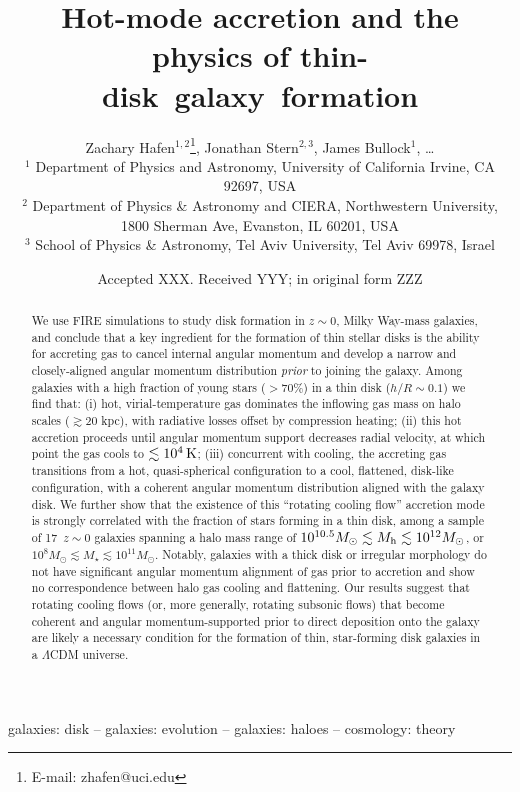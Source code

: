 \documentclass[fleqn,usenatbib]{mnras}
\title[Rotating cooling flows and thin galactic disks]{Hot-mode accretion and the physics of thin-disk~galaxy~formation}
\author[Hafen, Stern, Bullock et al.]{
Zachary Hafen$^{1,2}$\thanks{E-mail: zhafen@uci.edu},
Jonathan Stern$^{2,3}$,
James Bullock$^{1}$,
\ldots
\\
$^1$ Department of Physics and Astronomy, University of California Irvine, CA 92697, USA \\
$^2$ Department of Physics \& Astronomy and CIERA, Northwestern University, 1800 Sherman Ave, Evanston, IL 60201, USA \\
$^3$ School of Physics \& Astronomy, Tel Aviv University, Tel Aviv 69978, Israel
}
\date{Accepted XXX. Received YYY; in original form ZZZ}
\newcommand{\Nsample}{17}
\begin{document}
\label{firstpage}
\pagerange{\pageref{firstpage}--\pageref{lastpage}}
\maketitle

\begin{abstract}
We use FIRE simulations to study disk formation in $z\sim 0$, Milky Way-mass galaxies, and conclude that a key ingredient for the formation of thin stellar disks is the ability for accreting gas to cancel internal angular momentum and develop a narrow and closely-aligned angular momentum distribution \textit{prior} to joining the galaxy.
Among galaxies with a high fraction of young stars ($>70\%$) in a thin disk ($h/R \sim 0.1$) we find that:
(i) hot, virial-temperature gas dominates the inflowing gas mass on halo scales ($\gtrsim 20$ kpc), with radiative losses offset by compression heating;
(ii) this hot accretion proceeds until angular momentum support decreases radial velocity, at which point the gas cools to $\lesssim10^4\,{\rm K}$; 
(iii) concurrent with cooling, the accreting gas transitions from a hot, quasi-spherical configuration to a cool, flattened, disk-like configuration, with a coherent angular momentum distribution aligned with the galaxy disk.
We further show that the existence of this ``rotating cooling flow'' accretion mode is strongly correlated with the fraction of stars forming in a thin disk, among a sample of \Nsample\ $z\sim0$ galaxies spanning a halo mass range of $10^{10.5} M_\odot \lesssim M_{\rm h} \lesssim 10^{12} M_\odot$, or $10^8 M_\odot \lesssim M_\star \lesssim 10^{11} M_\odot$.
Notably, galaxies with a thick disk or irregular morphology do not have significant angular momentum alignment of gas prior to accretion and show no correspondence between halo gas cooling and flattening.
Our results suggest that rotating cooling flows (or, more generally, rotating subsonic flows) that become coherent and angular momentum-supported prior to direct deposition onto the galaxy are likely a necessary condition for the formation of thin, star-forming disk galaxies in a $\Lambda$CDM universe.
\end{abstract}

\begin{keywords}
galaxies: disk -- galaxies: evolution -- galaxies: haloes -- cosmology: theory
\end{keywords}
\end{document}
